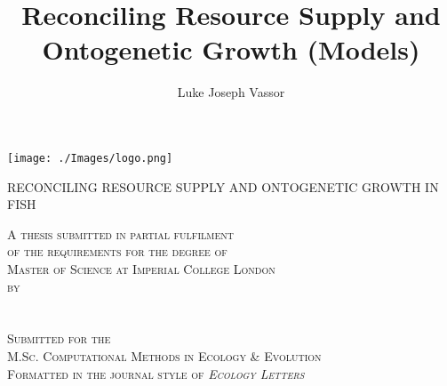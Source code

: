 \documentclass[a4paper]{article} %
\title{Reconciling Resource Supply and Ontogenetic Growth (Models)}
\author{Luke Joseph Vassor}
\begin{document}
\begin{titlepage}
    
    \texttt{[image: ./Images/logo.png]}\\%
     
    
    \center %
    
    
    \makeatletter
    \linespread{1.5} %
        {\huge{RECONCILING RESOURCE SUPPLY AND ONTOGENETIC GROWTH IN FISH}\par} %
    \vspace{2.5cm} %

    \textsc{A thesis submitted in partial fulfilment \\ of the requirements for the degree of \\ Master of Science at Imperial College London \\ by \\ \ }\\[2.5cm]
    \textsc{\Large \@author}\\[2.5cm]
    \textsc{Submitted for the \\ M.Sc. Computational Methods in Ecology \& Evolution \\ Formatted in the journal style of \textit{Ecology Letters} \\ \ }\\[2cm]


\end{titlepage}
\end{document}
